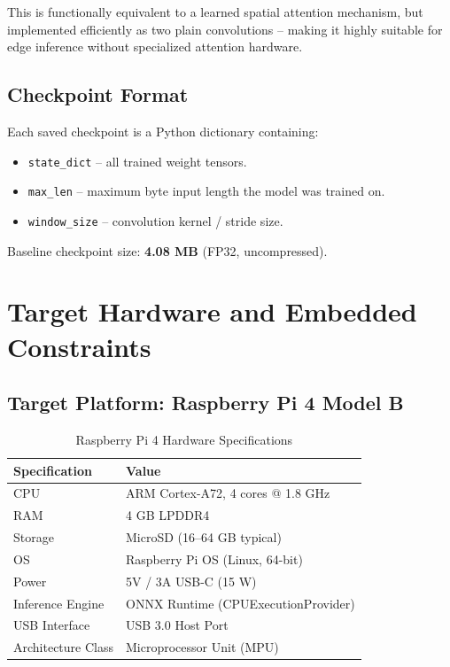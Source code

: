 \documentclass[12pt,a4paper]{article}
\begin{document}
This is functionally equivalent to a learned spatial attention mechanism, but
implemented efficiently as two plain convolutions -- making it highly
suitable for edge inference without specialized attention hardware.

\subsection{Checkpoint Format}

Each saved checkpoint is a Python dictionary containing:
\begin{itemize}
  \item \texttt{state\_dict} -- all trained weight tensors.
  \item \texttt{max\_len} -- maximum byte input length the model was trained on.
  \item \texttt{window\_size} -- convolution kernel / stride size.
\end{itemize}

Baseline checkpoint size: \textbf{4.08 MB} (FP32, uncompressed).

\section{Target Hardware and Embedded Constraints}

\subsection{Target Platform: Raspberry Pi 4 Model B}

\begin{table}[h!]
\centering
\caption{Raspberry Pi 4 Hardware Specifications}
\renewcommand{\arraystretch}{1.3}
\begin{tabular}{L{4cm} L{8cm}}
\toprule
{}
\color{white}\textbf{Specification} & \color{white}\textbf{Value} \\
\midrule
CPU & ARM Cortex-A72, 4 cores @ 1.8 GHz \\
RAM & 4 GB LPDDR4 \\
Storage & MicroSD (16--64 GB typical) \\
OS & Raspberry Pi OS (Linux, 64-bit) \\
Power & 5V / 3A USB-C (15 W) \\
Inference Engine & ONNX Runtime (CPUExecutionProvider) \\
USB Interface & USB 3.0 Host Port \\
Architecture Class & Microprocessor Unit (MPU) \\
\bottomrule
\end{tabular}
\end{table}
\end{document}
